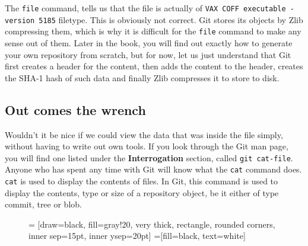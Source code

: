 The \texttt{file} command, tells us that the file is actually of \texttt{VAX COFF executable - version 5185} filetype.  This is obviously not correct.  Git stores its objects by Zlib compressing them, which is why it is difficult for the \texttt{file} command to make any sense out of them.  Later in the book, you will find out exactly how to generate your own repository from scratch, but for now, let us just understand that Git first creates a header for the content, then adds the content to the header, creates the SHA-1 hash of such data and finally Zlib compresses it to store to disk.

\subsection{Out comes the wrench}
Wouldn't it be nice if we could view the data that was inside the file simply, without having to write out own tools.  If you look through the Git man page, you will find one listed under the \textbf{Interrogation} section, called \texttt{git cat-file}.  Anyone who has spent any time with Git will know what the \texttt{cat} command does.  \texttt{cat} is used to display the contents of files.  In Git, this command is used to display the contents, type or size of a repository object, be it either of type commit, tree or blob.

\begin{figure}[hbt]
 = [draw=black, fill=gray!20, very thick, rectangle, rounded corners, inner sep=15pt, inner ysep=20pt]
 =[fill=black, text=white]
\end{figure}

